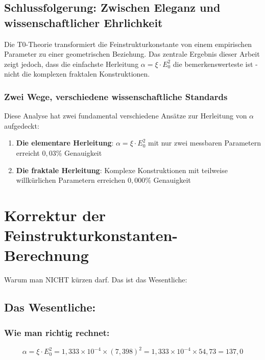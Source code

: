 \documentclass[12pt,a4paper]{article}
\theoremstyle{definition}
\begin{document}
	\subsection{Schlussfolgerung: Zwischen Eleganz und wissenschaftlicher Ehrlichkeit}
	
	Die T0-Theorie transformiert die Feinstrukturkonstante von einem empirischen Parameter zu einer geometrischen Beziehung. Das zentrale Ergebnis dieser Arbeit zeigt jedoch, dass die einfachste Herleitung $\alpha = \xi \cdot E_0^2$ die bemerkenswerteste ist - nicht die komplexen fraktalen Konstruktionen.
	
	\subsubsection{Zwei Wege, verschiedene wissenschaftliche Standards}
	
	Diese Analyse hat zwei fundamental verschiedene Ansätze zur Herleitung von $\alpha$ aufgedeckt:
	
	\begin{enumerate}
		\item \textbf{Die elementare Herleitung}: $\alpha = \xi \cdot E_0^2$ mit nur zwei messbaren Parametern erreicht $0{,}03\%$ Genauigkeit
		\item \textbf{Die fraktale Herleitung}: Komplexe Konstruktionen mit teilweise willkürlichen Parametern erreichen $0{,}000\%$ Genauigkeit
	\end{enumerate}
\section{Korrektur der Feinstrukturkonstanten-Berechnung}

 Warum man NICHT kürzen darf. Das ist das Wesentliche:

\subsection{Das Wesentliche:}

\subsubsection{Wie man richtig rechnet:}

\begin{equation}
	\alpha = \xi \cdot E_0^2 = 1{,}333 \times 10^{-4} \times (7{,}398)^2 = 1{,}333 \times 10^{-4} \times 54{,}73 = 137{,}0
\end{equation}
\end{document}

